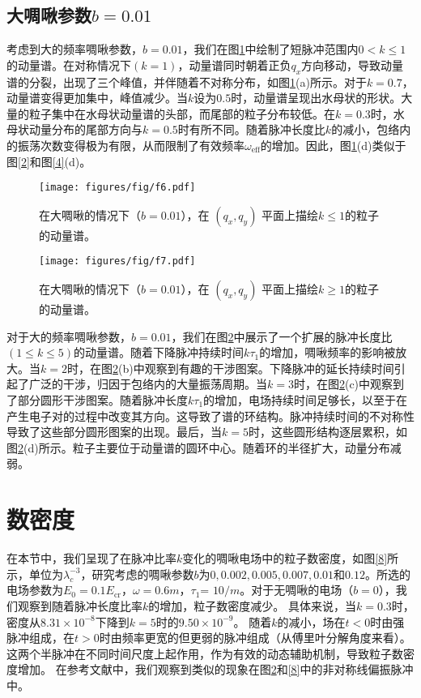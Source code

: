 \subsection{大啁啾参数\texorpdfstring{$b = 0.01$}{b=0.01}}

考虑到大的频率啁啾参数，$b = 0.01$，我们在图\ref{6}中绘制了短脉冲范围内$0< k\le 1$的动量谱。在对称情况下$(k = 1)$，动量谱同时朝着正负$q_x$方向移动，导致动量谱的分裂，出现了三个峰值，并伴随着不对称分布，如图\ref{6}(a)所示。对于$k = 0.7$，动量谱变得更加集中，峰值减少。当$k$设为$0.5$时，动量谱呈现出水母状的形状。大量的粒子集中在水母状动量谱的头部，而尾部的粒子分布较低。在$k = 0.3$时，水母状动量分布的尾部方向与$k = 0.5$时有所不同。随着脉冲长度比$k$的减小，包络内的振荡次数变得极为有限，从而限制了有效频率$\omega_{\text{eff}}$的增加。因此，图\ref{6}(d)类似于图\ref{2}和图\ref{4}(d)。

\begin{figure}
  \centering
  \texttt{[image: figures/fig/f6.pdf]}
  \caption{在大啁啾的情况下（$b = 0.01$），在 $(q_x, q_y)$ 平面上描绘$k \le 1$的粒子的动量谱。}
  \label{6}
\end{figure}

\begin{figure}
  \centering
  \texttt{[image: figures/fig/f7.pdf]}
  \caption{在大啁啾的情况下（$b = 0.01$），在 $(q_x, q_y)$ 平面上描绘$k \ge 1$的粒子的动量谱。}
  \label{7}
\end{figure}
  
对于大的频率啁啾参数，$b = 0.01$，我们在图\ref{7}中展示了一个扩展的脉冲长度比$(1\le k\le 5)$的动量谱。随着下降脉冲持续时间$k \tau_{1}$的增加，啁啾频率的影响被放大。当$k = 2$时，在图\ref{7}(b)中观察到有趣的干涉图案。下降脉冲的延长持续时间引起了广泛的干涉，归因于包络内的大量振荡周期。当$k = 3$时，在图\ref{7}(c)中观察到了部分圆形干涉图案。随着脉冲长度$k \tau_1$的增加，电场持续时间足够长，以至于在产生电子对的过程中改变其方向。这导致了谱的环结构。脉冲持续时间的不对称性导致了这些部分圆形图案的出现。最后，当$k = 5$时，这些圆形结构逐层累积，如图\ref{7}(d)所示。粒子主要位于动量谱的圆环中心。随着环的半径扩大，动量分布减弱。

\section{数密度}\label{density}

在本节中，我们呈现了在脉冲比率$k$变化的啁啾电场中的粒子数密度，如图\ref{8}所示，单位为$\lambda_{c} ^{-3}$，研究考虑的啁啾参数$b$为$0, 0.002, 0.005, 0.007, 0.01$和$0.12$。所选的电场参数为$E_0 = 0.1E_{\mathrm{cr}}$，$\omega= 0.6m$，$\tau_1$= $10/m$。对于无啁啾的电场（$b = 0$），我们观察到随着脉冲长度比率$k$的增加，粒子数密度减少。 具体来说，当$k = 0.3$时，密度从$8.31 \times 10^{-8}$下降到$k = 5$时的$9.50 \times 10^{-9}$。 随着$k$的减小，场在$t < 0$时由强脉冲组成，在$t > 0$时由频率更宽的但更弱的脉冲组成（从傅里叶分解角度来看）。这两个半脉冲在不同时间尺度上起作用，作为有效的动态辅助机制，导致粒子数密度增加。
在参考文献\cite{2020as}中，我们观察到类似的现象在图\ref{7}和\ref{8}中的非对称线偏振脉冲中。

